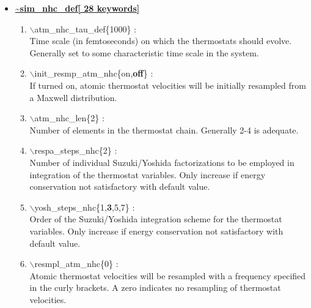 \documentclass[12pt]{article}
\begin{document}
\begin{itemize}
\begin{enumerate}
\end{enumerate}

\clearpage
\huge
\item[] \underline{\bf \~{}sim\_nhc\_def[ 28 keywords]}
\begin{enumerate}
 \vspace{0.15in} \Large
 \item   $\backslash$atm\_nhc\_tau\_def\{1000\} : \\
 \large
  Time scale (in femtoseconds) on which the thermostats should evolve. 
  Generally set to some characteristic time scale in the system.

 \vspace{0.15in} \Large
 \item   $\backslash$init\_resmp\_atm\_nhc\{on,{\bf off}\} : \\
  \large
   If turned on, atomic thermostat velocities will be initially resampled from
   a Maxwell distribution.

 \vspace{0.15in} \Large
 \item   $\backslash$atm\_nhc\_len\{2\} : \\
  \large
   Number of elements in the thermostat chain.  Generally 2-4 is adequate.

 \vspace{0.15in}\Large
 \item   $\backslash$respa\_steps\_nhc\{2\} : \\
   \large
     Number of individual Suzuki/Yoshida factorizations to be employed in
     integration of the thermostat variables.  Only
     increase if energy conservation not satisfactory with default value.

 \vspace{0.15in}\Large
 \item   $\backslash$yosh\_steps\_nhc\{1,{\bf 3},5,7\} : \\
  \large
   Order of the Suzuki/Yoshida integration scheme for the thermostat
   variables.  Only increase if energy conservation not satisfactory with
   default value.

 \vspace{0.15in} \Large
 \item   $\backslash$resmpl\_atm\_nhc\{0\} : \\
  \large
   Atomic thermostat velocities will be resampled with a frequency specified
   in the curly brackets.  A zero indicates no resampling of thermostat
   velocities.


\end{enumerate}
\end{itemize}
\end{document}
